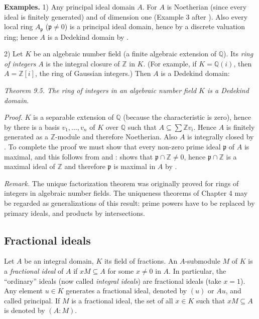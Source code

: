 
\noindent\textbf{Examples.} 1) Any principal ideal domain $A$. For $A$ is Noetherian (since every ideal is finitely generated) and of dimension one (Example 3 after ). Also every local ring $A_{\mathfrak p}$ ($\mathfrak p\neq0$) is a principal ideal domain, hence by  a discrete valuation ring; hence $A$ is a Dedekind domain by .

2) Let $K$ be an algebraic number field (a finite algebraic extension of $\mathbb Q$). Its \textit{ring of integers} $A$ is the integral closure of $\mathbb Z$ in $K$. (For example, if $K=\mathbb Q(i)$, then $A=\mathbb Z[i]$, the ring of Gaussian integers.) Then $A$ is a Dedekind domain:

\noindent\textit{Theorem 9.5. The ring of integers in an algebraic number field $K$ is a Dedekind domain.}

\noindent\textit{Proof.} $K$ is a separable extension of $\mathbb Q$ (because the characteristic is zero), hence by  there is a basis $v_1,\ldots,v_n$ of $K$ over $\mathbb Q$ such that $A\subseteq\sum\mathbb Zv_i$. Hence $A$ is finitely generated as a $\mathbb Z$-module and therefore Noetherian. Also $A$ is integrally closed by . To complete the proof we must show that every non-zero prime ideal $\mathfrak p$ of $A$ is maximal, and this follows from  and :  shows that $\mathfrak p\cap\mathbb Z\neq0$, hence $\mathfrak p\cap\mathbb Z$ is a maximal ideal of $\mathbb Z$ and therefore $\mathfrak p$ is maximal in $A$ by . \proofbox

\noindent\textit{Remark.} The unique factorization theorem  was originally proved for rings of integers in algebraic number fields. The uniqueness theorems of Chapter 4 may be regarded as generalizations of this result: prime powers have to be replaced by primary ideals, and products by intersections.

\subsection{Fractional ideals}

Let $A$ be an integral domain, $K$ its field of fractions. An $A$-submodule $M$ of $K$ is a \textit{fractional ideal} of $A$ if $xM\subseteq A$ for some $x\neq0$ in $A$. In particular, the ``ordinary'' ideals (now called \textit{integral ideals}) are fractional ideals (take $x=1$). Any element $u\in K$ generates a fractional ideal, denoted by $(u)$ or $Au$, and called principal. If $M$ is a fractional ideal, the set of all $x\in K$ such that $xM\subseteq A$ is denoted by $(A:M)$.


